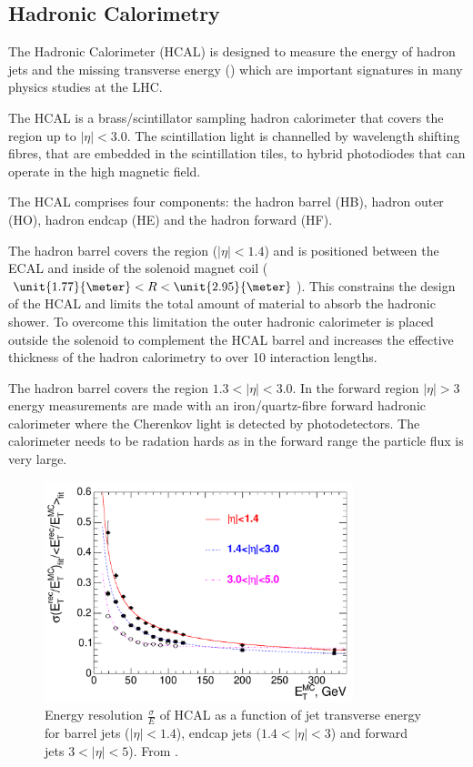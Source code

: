 \subsection{Hadronic Calorimetry}

The Hadronic Calorimeter (HCAL) is designed to measure the energy of
hadron jets and the missing transverse energy (\met) which are important
signatures in many physics studies at the LHC.

The HCAL is a brass/scintillator sampling hadron calorimeter that covers the
region up to $|\eta|<3.0$.
The scintillation light is channelled by wavelength shifting fibres, that are
embedded in the scintillation tiles, to hybrid photodiodes that can operate in
the high magnetic field. \cite{cms}

The HCAL comprises four components: the hadron barrel (HB), hadron outer (HO),
hadron endcap (HE) and the hadron forward (HF).

The hadron barrel covers the region ($|\eta| < 1.4$) and is positioned between
the ECAL and inside of the solenoid magnet coil
($\unit{1.77}{\meter}<R<\unit{2.95}{\meter}$).
This constrains the design of the HCAL and limits the total amount of material
to absorb the hadronic shower. 
To overcome this limitation the outer hadronic calorimeter is
placed outside the solenoid to complement the HCAL barrel and increases the
effective thickness of the hadron calorimetry to over 10 interaction lengths.

The hadron barrel covers the region $1.3 < |\eta| < 3.0$.
In the forward region $|\eta| > 3$ energy measurements are made with an
iron/quartz-fibre forward hadronic calorimeter where the Cherenkov light is
detected by photodetectors. The calorimeter needs to be radation hards as in the
forward range the particle flux is very large.

\begin{figure}[htb!]
  \centering
  \includegraphics[width=0.8\textwidth]{hcal_performance}
  \caption{Energy resolution $\frac{\sigma}{E}$ of HCAL as a function of jet
  \label{fig:HCAL}
transverse energy for barrel jets ($|\eta| < 1.4$), endcap jets ($1.4<|\eta| <
3$) and forward jets $3<|\eta| < 5$). From \cite{cms}.}
\end{figure}


